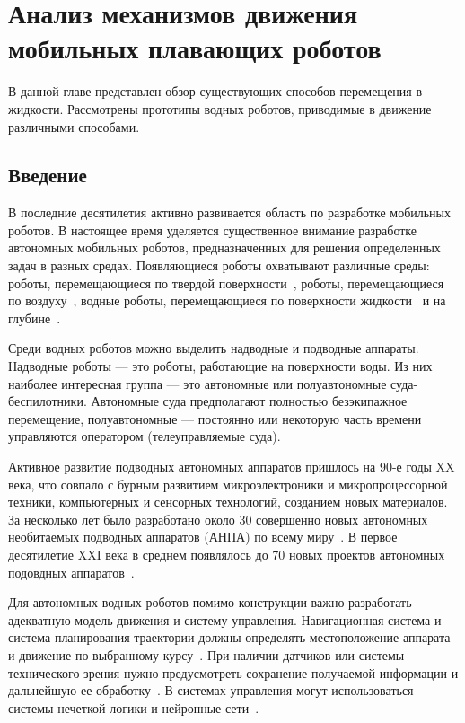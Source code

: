 \chapter{Анализ механизмов движения мобильных плавающих роботов}\label{ch:ch1}

В данной главе представлен обзор существующих способов перемещения в жидкости. Рассмотрены прототипы водных роботов, приводимые в движение различными способами. 

\section{Введение}\label{sec:ch1/sec1}

В последние десятилетия активно развивается область по разработке мобильных роботов. В настоящее время уделяется существенное внимание разработке автономных мобильных роботов, предназначенных для решения определенных задач в разных средах. Появляющиеся роботы охватывают различные среды: роботы, перемещающиеся по твердой поверхности~\cite{Lozano_2012, Domel_2017, Kilin_et_al_2017, Bozek_2020}, роботы, перемещающиеся по воздуху~\cite{Kim_2008, Miller_2007}, водные роботы, перемещающиеся по поверхности жидкости~\cite{Pshihopov_2014, Moreira_2011}  и на глубине~\cite{Pshihopov_2014, Gornak_MMT3000, Matvienko_2017}. 

Среди водных роботов можно выделить надводные и подводные аппараты. Надводные роботы --- это роботы, работающие на поверхности воды. Из них наиболее интересная группа --- это автономные или полуавтономные суда-беспилотники. Автономные суда предполагают полностью безэкипажное перемещение, полуавтономные --- постоянно или некоторую часть времени управляются оператором (телеуправляемые суда).

Активное развитие подводных автономных аппаратов пришлось на 90-е годы XX века, что совпало с бурным развитием микроэлектроники и микропроцессорной техники, компьютерных и сенсорных технологий, созданием новых материалов. За несколько лет было разработано около 30 совершенно новых автономных необитаемых подводных аппаратов (АНПА) по всему миру~\cite{Yuh_2000}. В первое десятилетие XXI века в среднем появлялось до 70 новых проектов автономных подовдных аппаратов~\cite{Bocharov_2009}.

Для автономных водных роботов помимо конструкции важно разработать адекватную модель движения и систему управления. Навигационная система и система планирования траектории должны определять местоположение аппарата и движение по выбранному курсу~\cite{Fiorelli_2006, Lapierre_2007, Burdinskiy_2012}. При наличии датчиков или системы технического зрения нужно предусмотреть сохранение получаемой информации и дальнейшую ее обработку~\cite{Huster_2001, Dunbabin_2006}. В системах управления могут использоваться системы нечеткой логики и нейронные сети~\cite{Loebis_2004, Ishii_1995, Xiang_2017, Zhang_2008}.

